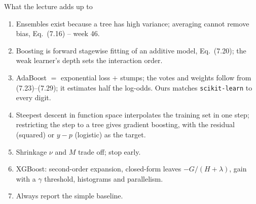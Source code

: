 \documentclass[10pt,aspectratio=169]{beamer}
\begin{document}
\begin{frame}{What the lecture adds up to}
\small
\begin{enumerate}
  \item Ensembles exist because a tree has high variance; averaging cannot
    remove bias, Eq.\ (7.16) -- week 46.
  \item Boosting is forward stagewise fitting of an additive model, Eq.\
    (7.20); the weak learner's depth sets the interaction order.
  \item AdaBoost $=$ exponential loss $+$ stumps; the votes and weights
    follow from (7.23)--(7.29); it estimates half the log-odds.  Ours
    matches \texttt{scikit-learn} to every digit.
  \item Steepest descent in function space interpolates the training set in
    one step; restricting the step to a tree gives gradient boosting, with
    the residual (squared) or $y-p$ (logistic) as the target.
  \item Shrinkage $\nu$ and $M$ trade off; stop early.
  \item XGBoost: second-order expansion, closed-form leaves $-G/(H+\lambda)$,
    gain with a $\gamma$ threshold, histograms and parallelism.
  \item Always report the simple baseline.
\end{enumerate}

\end{frame}
\end{document}
